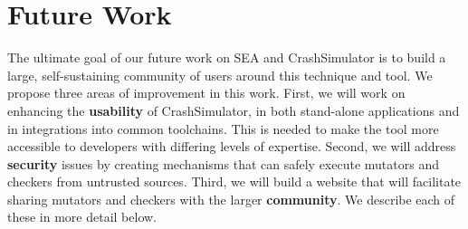 \section{Future Work}

The ultimate goal of our future work on SEA and CrashSimulator is to build
a large, self-sustaining community of users around this technique and tool.
%
%
%
%
%
%
We propose three areas of improvement in this work.  First, we
will work on enhancing the {\bf usability} of CrashSimulator, in both stand-alone
applications and in integrations into common toolchains.
This is needed
to make the tool more accessible to developers with differing levels of
expertise.
Second, we will address {\bf security} issues by creating
mechanisms that can safely execute mutators and checkers from
untrusted sources.
Third, we will build a website that will facilitate sharing mutators and
checkers with the larger {\bf community}.
We describe each of these in more detail below.


